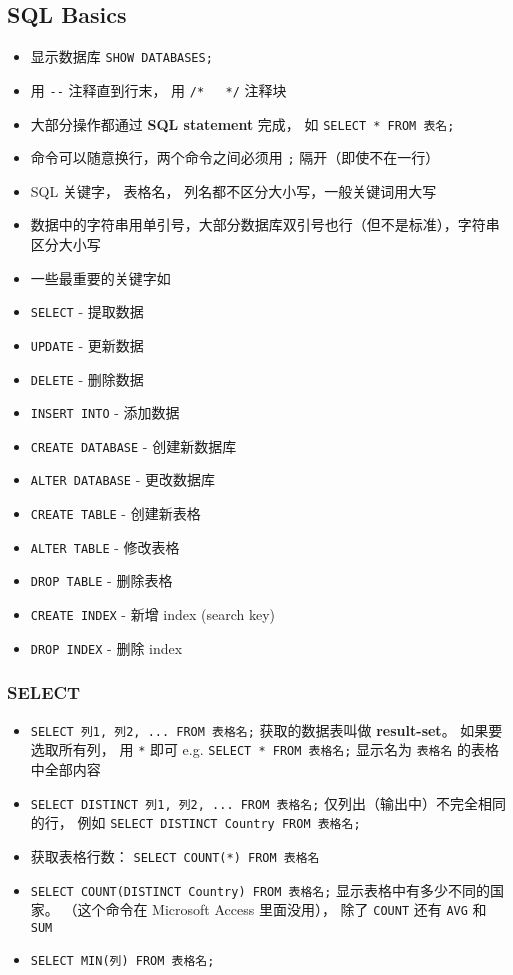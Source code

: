 \subsection{SQL Basics}
\begin{itemize}
\item 显示数据库 \verb`SHOW DATABASES;`
\item 用 \verb|--| 注释直到行末， 用 \verb|/*   */| 注释块
\item 大部分操作都通过 \textbf{SQL statement} 完成， 如 \verb`SELECT * FROM 表名;`
\item 命令可以随意换行，两个命令之间必须用 \verb|;| 隔开（即使不在一行）
\item SQL 关键字， 表格名， 列名都不区分大小写，一般关键词用大写
\item 数据中的字符串用单引号，大部分数据库双引号也行（但不是标准），字符串区分大小写
\item 一些最重要的关键字如
\item \verb`SELECT` - 提取数据
\item \verb`UPDATE` - 更新数据
\item \verb`DELETE` - 删除数据
\item \verb`INSERT INTO` - 添加数据
\item \verb`CREATE DATABASE` - 创建新数据库
\item \verb`ALTER DATABASE` - 更改数据库
\item \verb`CREATE TABLE` - 创建新表格
\item \verb`ALTER TABLE` - 修改表格
\item \verb`DROP TABLE` - 删除表格
\item \verb`CREATE INDEX` - 新增 index (search key)
\item \verb`DROP INDEX` - 删除 index
\end{itemize}

\subsubsection{SELECT}
\begin{itemize}
\item \verb`SELECT 列1, 列2, ... FROM 表格名;` 获取的数据表叫做 \textbf{result-set}。 如果要选取所有列， 用 \verb`*` 即可 e.g. \verb`SELECT * FROM 表格名;` 显示名为 \verb|表格名| 的表格中全部内容
\item \verb`SELECT DISTINCT 列1, 列2, ... FROM 表格名;` 仅列出（输出中）不完全相同的行， 例如 \verb`SELECT DISTINCT Country FROM 表格名;`
\item 获取表格行数： \verb`SELECT COUNT(*) FROM 表格名`
\item \verb`SELECT COUNT(DISTINCT Country) FROM 表格名;` 显示表格中有多少不同的国家。 （这个命令在 Microsoft Access 里面没用）， 除了 \verb|COUNT| 还有 \verb|AVG| 和 \verb|SUM|
\item \verb|SELECT MIN(列) FROM 表格名;|
\end{itemize}

